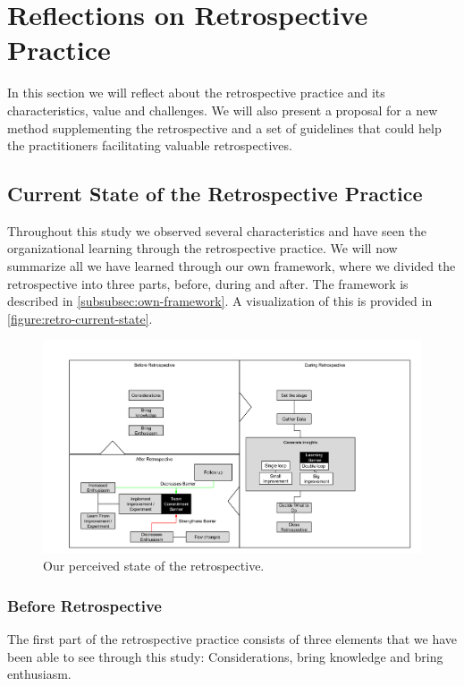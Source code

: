 \clearpage

\section{Reflections on Retrospective Practice}
In this section we will reflect about the retrospective practice and its characteristics, value and challenges. We will also present a proposal for a new method supplementing the retrospective and a set of guidelines that could help the practitioners facilitating valuable retrospectives. 

\subsection{Current State of the Retrospective Practice}
Throughout this study we observed several characteristics and have seen the organizational learning through the retrospective practice. We will now summarize all we have learned through our own framework, where we divided the retrospective into three parts, before, during and after. The framework is described in \autoref{subsubsec:own-framework}. A visualization of this is provided in \autoref{figure:retro-current-state}. 

\begin{figure}
	\centering
	\includegraphics[width=\textwidth, keepaspectratio]{figures/retro-outcome.png}
	\caption{Our perceived state of the retrospective.}
	\label{figure:retro-current-state}
\end{figure}

\afterpage{\clearpage}

\subsubsection{Before Retrospective}
The first part of the retrospective practice consists of three elements that we have been able to see through this study: Considerations, bring knowledge and bring enthusiasm. 

